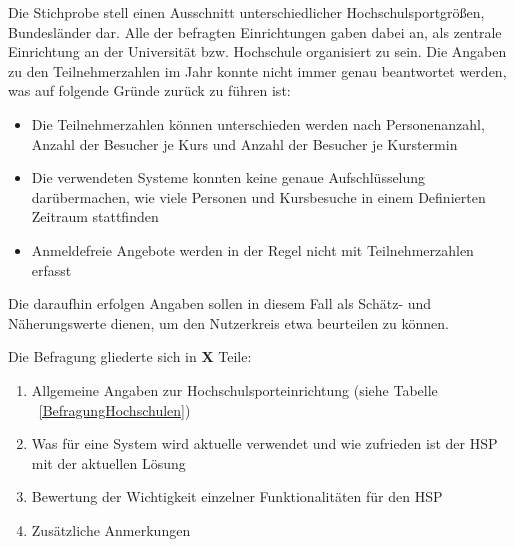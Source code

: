 Die Stichprobe stell einen Ausschnitt unterschiedlicher Hochschulsportgrößen, Bundesländer dar. Alle der befragten Einrichtungen gaben dabei an, als zentrale Einrichtung an der Universität bzw. Hochschule organisiert zu sein. Die Angaben zu den Teilnehmerzahlen im Jahr konnte nicht immer genau beantwortet werden, was auf folgende Gründe zurück zu führen ist:
\begin{itemize}
\item Die Teilnehmerzahlen können unterschieden werden nach Personenanzahl, Anzahl der Besucher je Kurs und Anzahl der Besucher je Kurstermin
\item Die verwendeten Systeme konnten keine genaue Aufschlüsselung darübermachen, wie viele Personen und Kursbesuche in einem Definierten Zeitraum stattfinden
\item Anmeldefreie Angebote werden in der Regel nicht mit Teilnehmerzahlen erfasst
\end{itemize}

Die daraufhin erfolgen Angaben sollen in diesem Fall als Schätz- und Näherungswerte dienen, um den Nutzerkreis etwa beurteilen zu können. 

Die Befragung gliederte sich in \textbf{X} Teile:

\begin{enumerate}
\item Allgemeine Angaben zur Hochschulsporteinrichtung (siehe Tabelle ~\ref{BefragungHochschulen})
\item Was für eine System wird aktuelle verwendet und wie zufrieden ist der HSP mit der aktuellen Lösung
\item Bewertung der Wichtigkeit einzelner Funktionalitäten für den HSP
\item Zusätzliche Anmerkungen
\end{enumerate}

